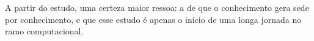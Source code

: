 \documentclass[
	12pt,				%
    oneside,			%
	a4paper,			%
	english,			%
	french,				%
	spanish,			%
	brazil,				%
	]{abntex2}
\begin{document}
A partir do estudo, uma certeza maior ressoa: a de que o conhecimento gera sede por conhecimento, e que esse estudo é apenas o início de uma longa jornada no ramo computacional.



\postextual








\end{document}
